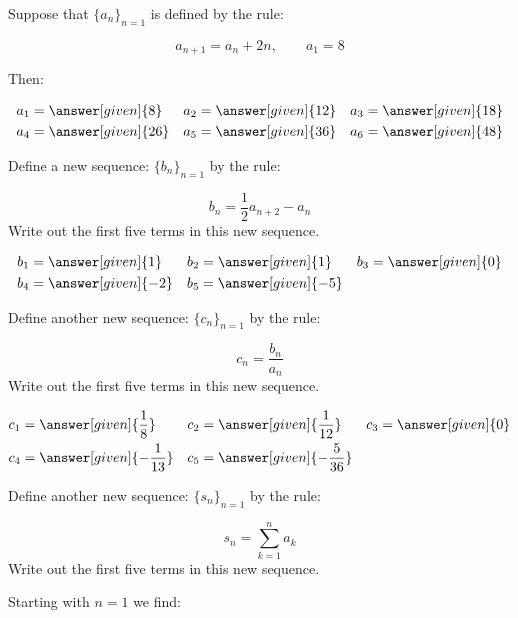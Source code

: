 \documentclass{ximera}
\author{Jim Talamo}
\begin{document}
\begin{exercise}

Suppose that $\{a_n\}_{n=1}$ is defined by the rule:

\[
 a_{n+1} = a_{n}+2n , \qquad a_1 = 8
\]

Then:

    \begin{align*}
       a_1 &= \answer[given]{8} & 
      a_2 &= \answer[given]{12} & 
      a_3 &= \answer[given]{18} \\
      a_4 &= \answer[given]{26} & 
      a_5 &= \answer[given]{36}  & 
      a_6 &= \answer[given]{48} 
    \end{align*}

\begin{exercise}
Define a new sequence: $\{b_n\}_{n=1}$ by the rule:

\[
b_n = \frac{1}{2}a_{n+2} - a_n
\]
Write out the first five terms in this new sequence.
    
     \begin{align*}
     	b_1 &=  \answer[given]{1}  & 
      	b_2 &=  \answer[given]{1}  & 
	b_3 &= \answer[given]{0}  \\ 
	b_4 &= \answer[given]{-2}  & 
	b_5 &=  \answer[given]{-5}  & 
    \end{align*}
    

    
\end{exercise}

\begin{exercise}
Define another new sequence: $\{c_n\}_{n=1}$ by the rule:

\[
c_n = \frac{b_n}{a_n} 
\]
Write out the first five terms in this new sequence.

     \begin{align*}
     	c_1 &=  \answer[given]{\frac{1}{8}}  & 
      	c_2 &=  \answer[given]{\frac{1}{12}}  & 
	c_3 &= \answer[given]{0}   \\ 
	c_4 &= \answer[given]{-\frac{1}{13}}   & 
	c_5 &= \answer[given]{-\frac{5}{36}}   & 
    \end{align*}
    

\end{exercise}

\begin{exercise}
Define another new sequence: $\{s_n\}_{n=1}$ by the rule:

\[
s_n = \sum_{k=1}^n a_k 
\]
Write out the first five terms in this new sequence.

Starting with $n=1$ we find:


\end{exercise}
\end{exercise}
\end{document}
